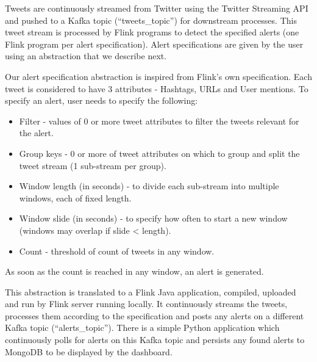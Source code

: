 \documentclass[letterpaper,10pt,english]{sphinxmanual}
\begin{document}
Tweets are continuously streamed from Twitter using the Twitter Streaming API and pushed to a Kafka topic (“tweets\_topic”) for downstream processes. This tweet stream is processed by Flink programs to detect the specified alerts (one Flink program per alert specification). Alert specifications are given by the user using an abstraction that we describe next.

Our alert specification abstraction is inspired from Flink’s own specification. Each tweet is considered to have 3 attributes - Hashtags, URLs and User mentions. To specify an alert, user needs to specify the following:
\begin{itemize}
\item {} 
Filter - values of 0 or more tweet attributes to filter the tweets relevant for the alert.

\item {} 
Group keys - 0 or more of tweet attributes on which to group and split the tweet stream (1 sub-stream per group).

\item {} 
Window length (in seconds) - to divide each sub-stream into multiple windows, each of fixed length.

\item {} 
Window slide (in seconds) - to specify how often to start a new window (windows may overlap if slide \textless{} length).

\item {} 
Count - threshold of count of tweets in any window.

\end{itemize}

As soon as the count is reached in any window, an alert is generated.

This abstraction is translated to a Flink Java application, compiled, uploaded and run by Flink server running locally. It continuously streams the tweets, processes them according to the specification and posts any alerts on a different Kafka topic (“alerts\_topic”). There is a simple Python application which continuously polls for alerts on this Kafka topic and persists any found alerts to MongoDB to be displayed by the dashboard.
\end{document}
